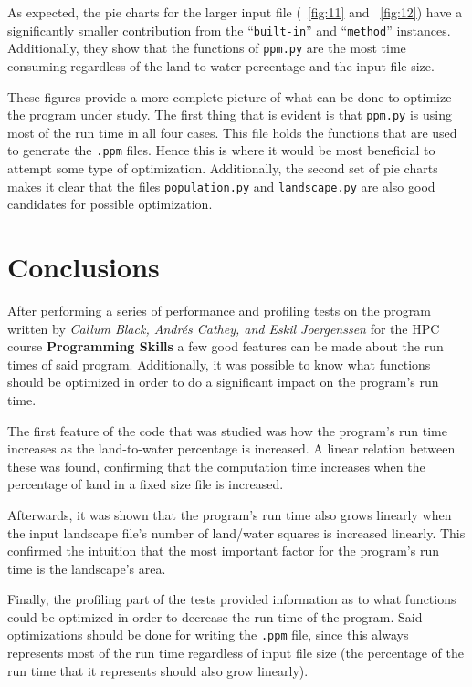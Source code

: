 \documentclass[12pt,a4paper]{article}
\begin{document}
As expected, the pie charts for the larger input file (~\ref{fig:11} and 
~\ref{fig:12}) have a significantly smaller contribution from the 
``\texttt{built-in}'' and ``\texttt{method}'' instances. Additionally, they 
show that the functions of \texttt{ppm.py} are the most time consuming 
regardless of the land-to-water percentage and the input file size.

These figures provide a more complete picture of what can be done to optimize 
the program under study. The first thing that is evident is that 
\texttt{ppm.py} is using most of the run time in all four cases. This file 
holds the functions that are used to generate the \texttt{.ppm} files. Hence 
this is where it would be most beneficial to attempt some type of 
optimization. Additionally, the second set of pie charts makes it clear that 
the files \texttt{population.py} and \texttt{landscape.py} are also good 
candidates for possible optimization.


\section{Conclusions}

After performing a series of performance and profiling tests on the program 
written by \textit{Callum Black, Andr\'es Cathey, and Eskil Joergenssen} for the 
HPC course \textbf{Programming Skills} a few good features can be made 
about the 
run times of said program. Additionally, it was possible to know what functions 
should be optimized in order to do a significant impact on the program's run 
time.

The first feature of the code that was studied was how the program's run time 
increases as the land-to-water percentage is increased. A linear relation 
between these was found, confirming that the computation time increases when 
the percentage of land in a fixed size file is increased. 

Afterwards, it was shown that the program's run time also grows linearly when 
the input landscape file's number of land/water squares is increased linearly. 
This confirmed the intuition that the most important factor for the program's 
run time is the landscape's area. 

Finally, the profiling part of the tests provided information as to what 
functions could be optimized in order to decrease the run-time of the program. 
Said optimizations should be done for writing the \texttt{.ppm} file, since 
this always represents most of the run time regardless of input file size (the 
percentage of the run time that it represents should also grow linearly).
\end{document}
